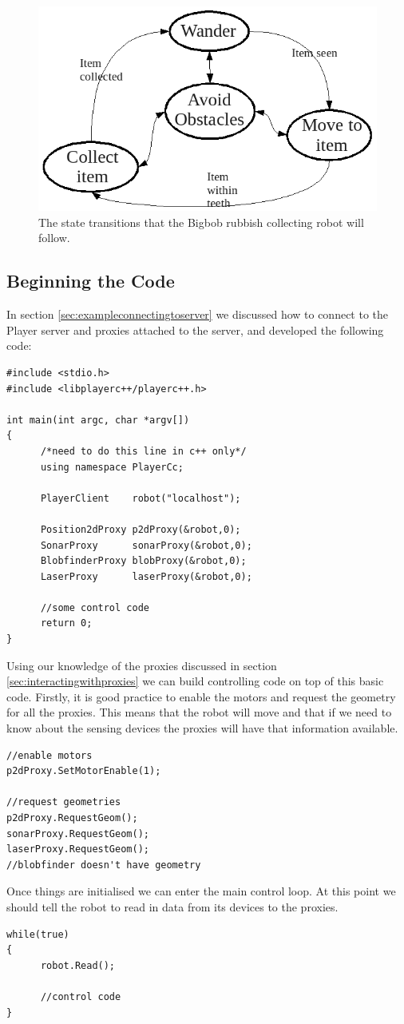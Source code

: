 \documentclass[a4paper]{report}
\newcommand{\pl}{Player\xspace}
\begin{document}
\begin{figure}
	\centering
	\includegraphics[width=\linewidth]{./pics/coding/arch_structureOA.png}
	\caption{The state transitions that the Bigbob rubbish collecting robot will follow.}
	\label{fig:archstructure}
\end{figure} 

\subsection{Beginning the Code}

In section \ref{sec:exampleconnectingtoserver} we discussed how to connect to the \pl server and proxies attached to the server, and developed the following code:
\begin{verbatim}
#include <stdio.h>
#include <libplayerc++/playerc++.h>

int main(int argc, char *argv[])
{
      /*need to do this line in c++ only*/
      using namespace PlayerCc;
	
      PlayerClient    robot("localhost");

      Position2dProxy p2dProxy(&robot,0);
      SonarProxy      sonarProxy(&robot,0);
      BlobfinderProxy blobProxy(&robot,0);
      LaserProxy      laserProxy(&robot,0);

      //some control code
      return 0;
}
\end{verbatim}
Using our knowledge of the proxies discussed in section \ref{sec:interactingwithproxies} we can build controlling code on top of this basic code. 
Firstly, it is good practice to enable the motors and request the geometry for all the proxies. This means that the robot will move and that if we need to know about the sensing devices the proxies will have that information available.
\begin{verbatim}
//enable motors
p2dProxy.SetMotorEnable(1);

//request geometries
p2dProxy.RequestGeom();
sonarProxy.RequestGeom();
laserProxy.RequestGeom();
//blobfinder doesn't have geometry
\end{verbatim}
Once things are initialised we can enter the main control loop. At this point we should tell the robot to read in data from its devices to the proxies.
\begin{verbatim}
while(true)
{
      robot.Read();

      //control code
}
\end{verbatim}
\end{document}
